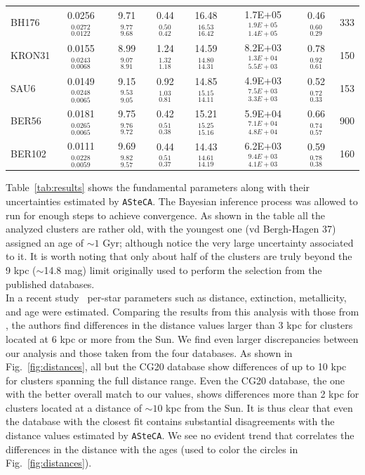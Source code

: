 \documentclass[draft]{aa}
\begin{document}
\begin{table}
\begin{tabular}{lccccccc}
  BH176 & 0.0256$_{0.0122}^{0.0272}$ & 9.71$_{9.68}^{9.77}$ & 0.44$_{0.42}^{0.50}$ &
  16.48$_{16.42}^{16.53}$ & 1.7E+05$_{1.4E+05}^{1.9E+05}$ & 0.46$_{0.29}^{0.60}$ &
  333 \\[.2cm]
  KRON31 & 0.0155$_{0.0068}^{0.0243}$ & 8.99 $_{8.91}^{9.07 }$ & 1.24$_{1.18}^{1.32}$ &
  14.59$_{14.31}^{14.80}$ & 8.2E+03$_{5.5E+03}^{1.3E+04}$ & 0.78$_{0.61}^{0.92}$ &
  150 \\[.2cm]
  SAU6 & 0.0149$_{0.0065}^{0.0248}$ & 9.15 $_{9.05}^{9.53 }$ & 0.92$_{0.81}^{1.03}$ &
  14.85$_{14.11}^{15.15}$ & 4.9E+03$_{3.3E+03}^{7.5E+03}$ & 0.52$_{0.33}^{0.72}$ &
  153 \\[.2cm]
  BER56 & 0.0181$_{0.0065}^{0.0265}$ & 9.75 $_{9.72}^{9.76 }$ & 0.42$_{0.38}^{0.51}$ &
  15.21$_{15.16}^{15.25}$ & 5.9E+04$_{4.8E+04}^{7.1E+04}$ & 0.66$_{0.57}^{0.74}$ &
  900 \\[.2cm]
  BER102 & 0.0111$_{0.0059}^{0.0228}$ & 9.69 $_{9.57}^{9.82 }$ & 0.44$_{0.37}^{0.51}$ &
  14.43$_{14.19}^{14.61}$ & 6.2E+03$_{4.1E+03}^{9.4E+03}$ & 0.59$_{0.38}^{0.78}$ &
  160 \\[.2cm]
  \hline
  \end{tabular}
  \end{table}

  Table~\ref{tab:results} shows the fundamental parameters along with their
  uncertainties estimated by \texttt{ASteCA}. The Bayesian inference process was
  allowed to run for enough steps to achieve convergence.
  As shown in the table all the analyzed clusters are rather old, with the
  youngest one (vd Bergh-Hagen 37) assigned an age of $\sim1$ Gyr; although
  notice the very large uncertainty associated to it. It is worth noting
  that only about half of the clusters are truly beyond the 9 kpc ($\sim$14.8
  mag) limit originally used to perform the selection from the published
  databases.\\

  In a recent study~\citep{Anders_2021} per-star parameters such as distance,
  extinction, metallicity, and age were estimated. Comparing the results
  from this analysis with those from \cite{Cantat_2020}, the authors find
  differences in the distance values larger than 3 kpc for clusters located at
  6 kpc or more from the Sun. We find even larger discrepancies between our
  analysis and those taken from the four databases. As shown in
  Fig.~\ref{fig:distances}, all but the CG20 database show differences of up
  to 10 kpc for clusters spanning the full distance range. Even the CG20
  database, the one with the better overall match to our values, shows
  differences more than 2 kpc for clusters located at a distance of $\sim10$ kpc
  from the Sun. It is thus clear that even the database with the closest fit
  contains substantial disagreements with the distance values estimated by 
  \texttt{ASteCA}. We see no evident trend that correlates the differences in
  the distance with the ages (used to color the circles in
  Fig.~\ref{fig:distances}).\\
\end{document}
